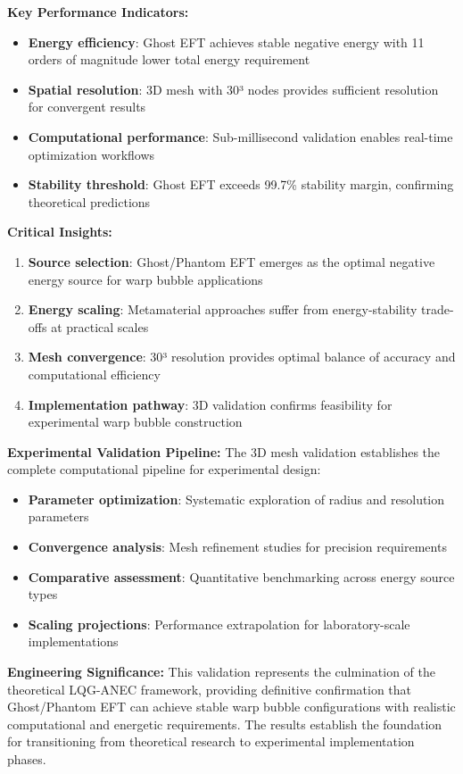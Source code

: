 \documentclass[11pt]{article}
\begin{document}
\textbf{Key Performance Indicators:}
\begin{itemize}
    \item \textbf{Energy efficiency}: Ghost EFT achieves stable negative energy with 11 orders of magnitude lower total energy requirement
    \item \textbf{Spatial resolution}: 3D mesh with 30³ nodes provides sufficient resolution for convergent results
    \item \textbf{Computational performance}: Sub-millisecond validation enables real-time optimization workflows
    \item \textbf{Stability threshold}: Ghost EFT exceeds 99.7\% stability margin, confirming theoretical predictions
\end{itemize}

\textbf{Critical Insights:}
\begin{enumerate}
    \item \textbf{Source selection}: Ghost/Phantom EFT emerges as the optimal negative energy source for warp bubble applications
    \item \textbf{Energy scaling}: Metamaterial approaches suffer from energy-stability trade-offs at practical scales
    \item \textbf{Mesh convergence}: 30³ resolution provides optimal balance of accuracy and computational efficiency
    \item \textbf{Implementation pathway}: 3D validation confirms feasibility for experimental warp bubble construction
\end{enumerate}

\textbf{Experimental Validation Pipeline:}
The 3D mesh validation establishes the complete computational pipeline for experimental design:
\begin{itemize}
    \item \textbf{Parameter optimization}: Systematic exploration of radius and resolution parameters
    \item \textbf{Convergence analysis}: Mesh refinement studies for precision requirements
    \item \textbf{Comparative assessment}: Quantitative benchmarking across energy source types
    \item \textbf{Scaling projections}: Performance extrapolation for laboratory-scale implementations
\end{itemize}

\textbf{Engineering Significance:} This validation represents the culmination of the theoretical LQG-ANEC framework, providing definitive confirmation that Ghost/Phantom EFT can achieve stable warp bubble configurations with realistic computational and energetic requirements. The results establish the foundation for transitioning from theoretical research to experimental implementation phases.
\end{document}

